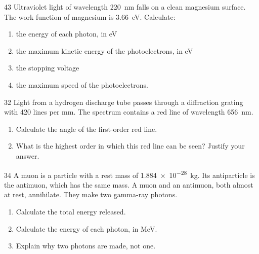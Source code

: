 \begin{practiceq}{4}{3}\label{pq:magnesium}
Ultraviolet light of wavelength \qty{220}{nm} falls on a clean magnesium surface. The work
function of magnesium is \qty{3.66}{eV}. Calculate:
\begin{enumerate}[label=(\alph*)]
  \item the energy of each photon, in eV 
  \item the maximum kinetic energy of the photoelectrons, in eV 
  \item the stopping voltage 
  \item the maximum speed of the photoelectrons. 
\end{enumerate}
\end{practiceq}

\begin{practiceq}{3}{2}\label{pq:grating}
Light from a hydrogen discharge tube passes through a diffraction grating with 420 lines per
mm. The spectrum contains a red line of wavelength \qty{656}{nm}.
\begin{enumerate}[label=(\alph*)]
  \item Calculate the angle of the first-order red line. 
  \item What is the highest order in which this red line can be seen? Justify your answer.
\end{enumerate}
\end{practiceq}

\begin{practiceq}{3}{4}\label{pq:muonpair}
A muon is a particle with a rest mass of \qty{1.884e-28}{kg}. Its antiparticle is the antimuon,
which has the same mass. A muon and an antimuon, both almost at rest, annihilate. They make two
gamma-ray photons.
\begin{enumerate}[label=(\alph*)]
  \item Calculate the total energy released. 
  \item Calculate the energy of each photon, in MeV. 
  \item Explain why two photons are made, not one. 
\end{enumerate}
\end{practiceq}

